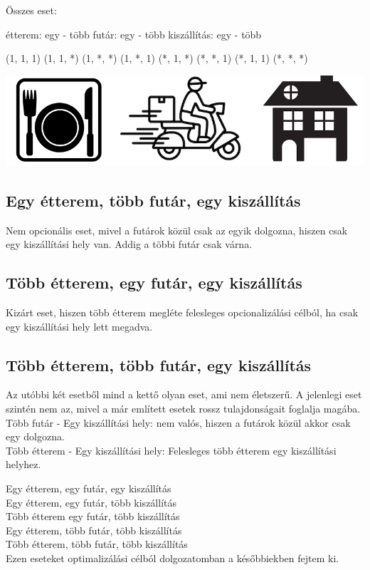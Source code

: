 

Összes eset:

étterem: egy - több
futár: egy - több
kiszállítás: egy - több

(1, 1, 1)
(1, 1, *)
(1, *, *)
(1, *, 1)
(*, 1, *)
(*, *, 1)
(*, 1, 1)
(*, *, *)

\includegraphics[scale=0.5]{images/complexModel.png} \\


\subsection{
Egy étterem, több futár, egy kiszállítás
}

Nem opcionális eset, mivel a futárok közül csak az egyik dolgozna, hiszen csak egy kiszállítási hely van. Addig a többi futár csak várna.

\subsection{
Több étterem, egy futár, egy kiszállítás
}

Kizárt eset, hiszen több étterem megléte felesleges opcionalizálási célból, ha csak egy kiszállítási hely lett megadva.

\subsection{
Több étterem, több futár, egy kiszállítás
}

Az utóbbi két esetből mind a kettő olyan eset, ami nem életszerű. A jelenlegi eset szintén nem az, mivel a már említett esetek rossz tulajdonságait foglalja magába. \\ Több futár - Egy kiszállítási hely: nem valós, hiszen a futárok közül akkor csak egy dolgozna. \\ Több étterem - Egy kiszállítási hely: Felesleges több étterem egy kiszállítási helyhez.


Egy étterem, egy futár, egy kiszállítás\\
Egy étterem, egy futár, több kiszállítás\\
Több étterem egy futár, több kiszállítás\\
Egy étterem, több futár, több kiszállítás\\
Több étterem, több futár, több kiszállítás\\
Ezen eseteket optimalizálási célból dolgozatomban a későbbiekben fejtem ki.
